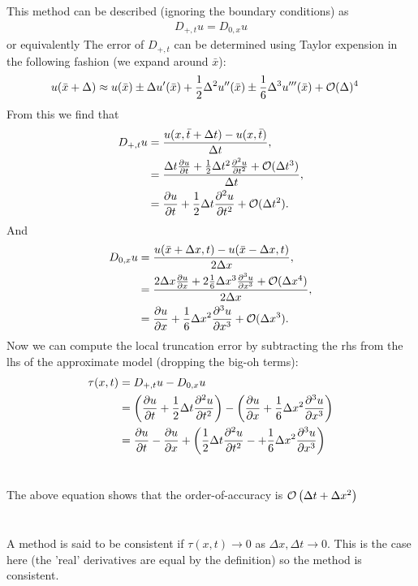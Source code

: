 
\usepackage[]{algorithm2e}


\section{}
 This method can be described (ignoring the boundary conditions) as
\begin{align}
  D_{+,t}u = D_{0,x}u
\end{align}
or equivalently
The error of $D_{+,t}$ can be determined using Taylor expension in the following fashion (we expand around $\bar x$):
\begin{align}
  u(\bar x + \Delta)&\approx
    u(\bar x)\pm \Delta u'(\bar x)
    + \frac{1}{2}\Delta^2u''(\bar x)
    \pm \frac{1}{6}\Delta^3u'''(\bar x)
    + \O(\Delta)^4
\end{align}
From this we find that
\begin{align}
  D_{+,t}u &= \frac{u(x, \bar t + \Delta t) - u(x, \bar t)}{\Delta t},\nn
  &= \frac{\Delta t \pdrv[t]{u} + \frac{1}{2}\Delta t^2\pdrv[t^2]{^2 u} + \O(\Delta t^3)}{\Delta t},\nn
  &= \pdrv[t]{u} + \frac{1}{2}\Delta t\pdrv[t^2]{^2 u} + \O(\Delta t^2).
\end{align}
And
\begin{align}
  D_{0,x}u &= \frac{u(\bar x + \Delta x, t) - u(\bar x - \Delta x, t)}{2\Delta x},\nn
  &= \frac{2 \Delta x \pdrv[x]{u} + 2 \frac{1}{6}\Delta x^3\pdrv[x^3]{^3 u}+\O(\Delta x^4)}{2 \Delta x},\nn
  &= \pdrv[x]{u}+\frac{1}{6}\Delta x^2\pdrv[x^3]{^3 u}+\O(\Delta x^3).
\end{align}
Now we can compute the local truncation error by subtracting the rhs from the lhs of the approximate model (dropping the big-oh terms):
\begin{align}
  \tau(x,t) &= D_{+,t}u-D_{0,x}u\nn
  &= \left(\pdrv[t]{u} + \frac{1}{2}\Delta t\pdrv[t^2]{^2 u}\right)-\left(\pdrv[x]{u}+\frac{1}{6}\Delta x^2\pdrv[x^3]{^3 u}\right)\nn
  &= \pdrv[t]{u} - \pdrv[x]{u} + \left(\frac{1}{2}\Delta t\pdrv[t^2]{^2 u} - +\frac{1}{6}\Delta x^2\pdrv[x^3]{^3 u}\right)
\end{align}
\section{}
The above equation shows that the order-of-accuracy is $\O\left(\Delta t + \Delta x^2\right)$
\section{}
A method is said to be consistent if $\tau(x,t)\to 0$ as $\Delta x, \Delta t \to 0$. This is the case here (the 'real' derivatives are equal
by the definition) so the method is consistent.


